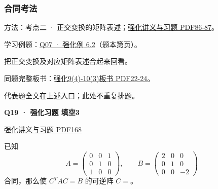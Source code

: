 \documentclass[UTF8,fontset=fandol,11pt,a4paper]{ctexart}
\newcommand{\source}[1]{{\footnotesize\color{Muted}#1\par}}
\newcommand{\qtitle}[2]{\par\needspace{5\baselineskip}\hypertarget{#1}{}\label{#1}\textbf{#2}\par}
\begin{document}
\subsubsection*{合同考法}
\hypertarget{node-A1C}{}
方法：考点二 · 正交变换的矩阵表述；\href{file:///Users/skyintelligence/Desktop/\%E5\%BE\%97\%E8\%AF\%BB\%E4\%B8\%AA\%E7\%A0\%94-\%E5\%8C\%97\%E5\%A4\%A7\%E8\%BD\%AF\%E5\%BE\%AE/\%E6\%95\%B0\%E5\%AD\%A6\%20150/Kira\%C2\%B727\%E7\%BA\%BF\%E6\%80\%A7\%E4\%BB\%A3\%E6\%95\%B0\%E5\%BC\%BA\%E5\%8C\%96\%E8\%AE\%B2\%E4\%B9\%89\%2B\%E4\%B9\%A0\%E9\%A2\%98.pdf\#page=86}{强化讲义与习题 PDF86-87}。\par
学习例题：\hyperlink{R-EX-02}{Q07 · 强化例 6.2}（题本第\pageref*{R-EX-02}页）。\par
\source{把正交变换及对应矩阵表述合起来回看。}
同题完整板书：\href{file:///Users/skyintelligence/Desktop/\%E5\%BE\%97\%E8\%AF\%BB\%E4\%B8\%AA\%E7\%A0\%94-\%E5\%8C\%97\%E5\%A4\%A7\%E8\%BD\%AF\%E5\%BE\%AE/\%E6\%95\%B0\%E5\%AD\%A6\%20150/\%E7\%BA\%BF\%E6\%80\%A7\%E4\%BB\%A3\%E6\%95\%B0/\%E7\%BA\%BF\%E4\%BB\%A3\%E5\%BC\%BA\%E5\%8C\%969\%284\%29-10\%283\%29\%20\%20\%E7\%AC\%AC\%E4\%BA\%94\%E5\%85\%AD\%E7\%AB\%A0\%20\%E5\%AE\%9E\%E5\%AF\%B9\%E7\%A7\%B0\%E7\%9F\%A9\%E9\%98\%B5\%26\%E4\%BA\%8C\%E6\%AC\%A1\%E5\%9E\%8B1\%E3\%80\%90\%E4\%BE\%8B5.6\%E3\%80\%91-\%E3\%80\%90\%E4\%BE\%8B6.4\%E3\%80\%91.pdf\#page=22}{强化9(4)-10(3)板书 PDF22-24}。\par
\vspace{3mm}
\source{代表题全文在上述入口；此处不重复排题。}
\begin{minipage}{\linewidth}
\qtitle{R-FILL-03}{Q19 · 强化习题 填空3}
\source{\href{file:///Users/skyintelligence/Desktop/\%E5\%BE\%97\%E8\%AF\%BB\%E4\%B8\%AA\%E7\%A0\%94-\%E5\%8C\%97\%E5\%A4\%A7\%E8\%BD\%AF\%E5\%BE\%AE/\%E6\%95\%B0\%E5\%AD\%A6\%20150/Kira\%C2\%B727\%E7\%BA\%BF\%E6\%80\%A7\%E4\%BB\%A3\%E6\%95\%B0\%E5\%BC\%BA\%E5\%8C\%96\%E8\%AE\%B2\%E4\%B9\%89\%2B\%E4\%B9\%A0\%E9\%A2\%98.pdf\#page=168}{强化讲义与习题 PDF168}}
已知
\[A=\begin{pmatrix}0&0&1\\0&1&0\\1&0&0\end{pmatrix},\qquad B=\begin{pmatrix}2&0&0\\0&1&0\\0&0&-2\end{pmatrix}\]
合同，那么使 $C^TAC=B$ 的可逆阵 $C=$\underline{\hspace{4cm}}。
\end{minipage}\par\vspace{7mm}
\end{document}
